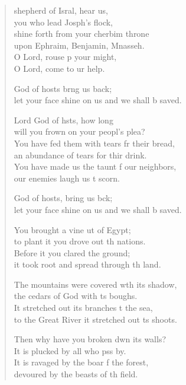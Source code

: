 \settowidth{\versewidth}{let your face shine on us and we shall be saved.}
\begin{verse}%
  \begin{patverse}
 shepherd of Isral, hear us,\Med\\
you who lead Josph’s flock,\\
shine forth from your cherbim throne\Med\\
upon Ephraim, Benjamin, Mnasseh.\\
O Lord, rouse p your might,\Med\\
O Lord, come to ur help.

God of hosts br\pointup{\i}ng us back;\Med\\
let your face shine on us and we shall b saved.

Lord God of hsts, how long\Med\\
will you frown on your peopl’s plea?\\
You have fed them with tears fr their bread,\Med\\
an abundance of tears for thir drink.\\
You have made us the taunt f our neighbors,\Med\\
our enemies laugh us t scorn.

God of hosts, bring us bck;\Med\\
let your face shine on us and we shall b saved.

You brought a vine ut of Egypt;\Med\\
to plant it you drove out th nations.\\
Before it you clared the ground;\Med\\
it took root and spread through th land.

The mountains were covered w\pointup{\i}th its shadow,\Med\\
the cedars of God with \pointup{\i}ts boughs.\\
It stretched out its branches t the sea,\Med\\
to the Great River it stretched out \pointup{\i}ts shoots.

Then why have you broken dwn its walls?\Med\\
It is plucked by all who pss by.\\
It is ravaged by the boar f the forest,\Med\\
devoured by the beasts of th field.


\end{patverse}
\end{verse}
